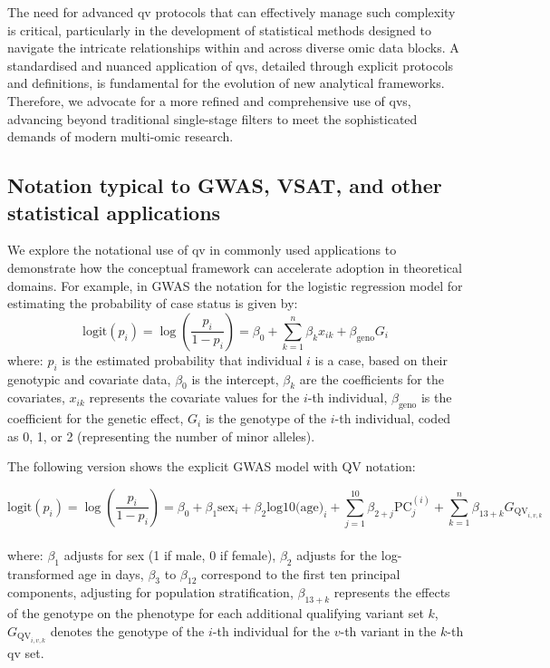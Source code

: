 The need for advanced \ac{qv} protocols that can effectively manage such complexity is critical, particularly in the development of statistical methods designed to navigate the intricate relationships within and across diverse omic data blocks. A standardised and nuanced application of \ac{qv}s, detailed through explicit protocols and definitions, is fundamental for the evolution of new analytical frameworks. Therefore, we advocate for a more refined and comprehensive use of \ac{qv}s, advancing beyond traditional single-stage filters to meet the sophisticated demands of modern multi-omic research. 

\subsection{Notation typical to GWAS, VSAT, and other statistical applications}
We explore the notational use of \ac{qv} in commonly used applications to demonstrate how the conceptual framework can accelerate adoption in theoretical domains. 
For example, in GWAS \cite{uffelmann2021genome} the notation for the logistic regression model for estimating the probability of case status is given by:
$$
\text{logit}(p_i) = \log\left(\frac{p_i}{1 - p_i}\right) = \beta_0 + \sum_{k=1}^n \beta_k x_{ik} + \beta_{\text{geno}} G_i
$$
where:
\( p_i \) is the estimated probability that individual \( i \) is a case, based on their genotypic and covariate data,
\( \beta_0 \) is the intercept,
\( \beta_k \) are the coefficients for the covariates,
\( x_{ik} \) represents the covariate values for the \( i \)-th individual,
\( \beta_{\text{geno}} \) is the coefficient for the genetic effect,
\( G_i \) is the genotype of the \( i \)-th individual, coded as 0, 1, or 2  (representing the number of minor alleles).

The following version shows the explicit GWAS model with QV notation:

$$
\text{logit}(p_i) = \log\left(\frac{p_i}{1 - p_i}\right) = \beta_0 + \beta_1 \text{sex}_i + \beta_2 \text{log10(age)}_i + \sum_{j=1}^{10} \beta_{2+j} \text{PC}_j^{(i)} + \sum_{k=1}^{n} \beta_{13+k} G_{\text{QV}_{i,v,k}}
$$\\
where:
\( \beta_1 \) adjusts for sex (1 if male, 0 if female),
\( \beta_2 \) adjusts for the log-transformed age in days,
\( \beta_3 \) to \( \beta_{12} \) correspond to the first ten principal components, adjusting for population stratification,
 \( \beta_{13+k} \) represents the effects of the genotype on the phenotype for each additional qualifying variant set \( k \),
\( G_{\text{QV}_{i,v,k}} \) denotes the genotype of the \( i \)-th individual for the \( v \)-th variant in the \( k \)-th \ac{qv} set.

